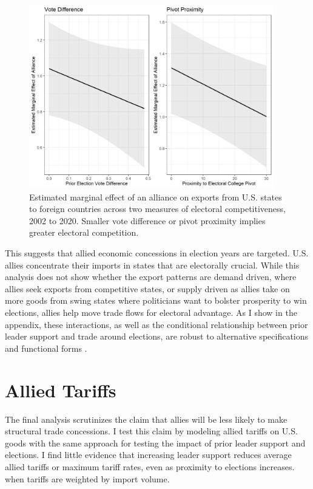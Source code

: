 \documentclass[12pt]{article}
\begin{document}
\begin{figure}[htpb]
	\centering
		\includegraphics[width=0.95\textwidth]{../figures/me-all-state.png}
	\caption{Estimated marginal effect of an alliance on exports from U.S. states to foreign countries across two measures of electoral competitiveness, 2002 to 2020. Smaller vote difference or pivot proximity implies greater electoral competition.}
	\label{fig:me-all-state}
\end{figure}


This suggests that allied economic concessions in election years are targeted. 
U.S. allies concentrate their imports in states that are electorally crucial.
While this analysis does not show whether the export patterns are demand driven, where allies seek exports from competitive states, or supply driven as allies take on more goods from swing states where politicians want to bolster prosperity to win elections, allies help move trade flows for electoral advantage. 
As I show in the appendix, these interactions, as well as the conditional relationship between prior leader support and trade around elections, are robust to alternative specifications and functional forms \citep{Hainmuelleretal2019}.



\section{Allied Tariffs} 


The final analysis scrutinizes the claim that allies will be less likely to make structural trade concessions. 
I test this claim by modeling allied tariffs on U.S. goods with the same approach for testing the impact of prior leader support and elections. 
I find little evidence that increasing leader support reduces average allied tariffs or maximum tariff rates, even as proximity to elections increases. when tariffs are weighted by import volume. 
\end{document}
